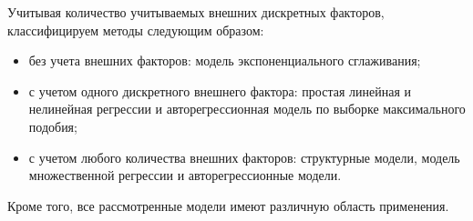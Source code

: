 Учитывая количество учитываемых внешних дискретных факторов, классифицируем методы следующим образом:
\begin{itemize}
    \item без учета внешних факторов: модель экспоненциального сглаживания;
    \item с учетом одного дискретного внешнего фактора: простая линейная и нелинейная регрессии и авторегрессионная модель по выборке максимального подобия;
    \item с учетом любого количества внешних факторов: структурные модели, модель множественной регрессии и авторегрессионные модели.
\end{itemize}

Кроме того, все рассмотренные модели имеют различную область применения.